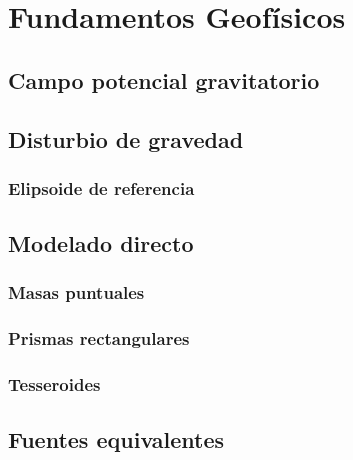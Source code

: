 \chapter{Fundamentos Geofísicos}

\section{Campo potencial gravitatorio}

\section{Disturbio de gravedad}

\subsection{Elipsoide de referencia}

\section{Modelado directo}

\subsection{Masas puntuales}

\subsection{Prismas rectangulares}

\subsection{Tesseroides}

\section{Fuentes equivalentes}
